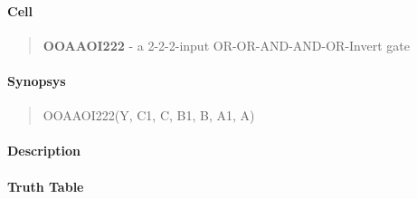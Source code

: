 \label{OOAAOI222}
\paragraph{Cell}
\begin{quote}
    \textbf{OOAAOI222} - a 2-2-2-input OR-OR-AND-AND-OR-Invert gate
\end{quote}

\paragraph{Synopsys}
\begin{quote}
    OOAAOI222(Y, C1, C, B1, B, A1, A)
\end{quote}

\paragraph{Description}

%

\paragraph{Truth Table}
%

